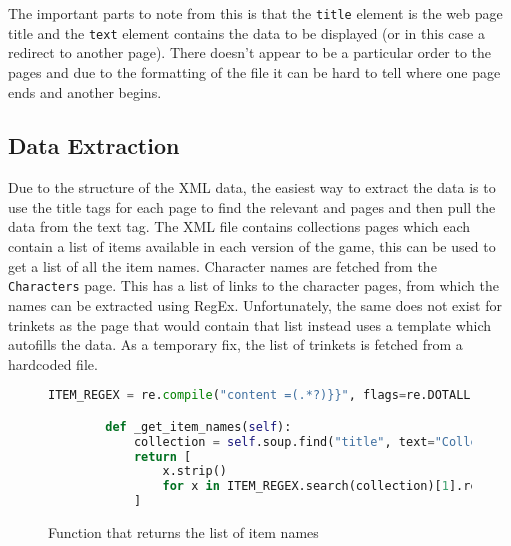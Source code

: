 The important parts to note from this is that the \verb|title| element is the web page title and the \verb|text| element contains the data to be displayed (or in this case a redirect to another page).
There doesn't appear to be a particular order to the pages and due to the formatting of the file it can be hard to tell where one page ends and another begins.
\subsection{Data Extraction}
Due to the structure of the XML data, the easiest way to extract the data is to use the title tags for each page to find the relevant and pages 
and then pull the data from the text tag. The XML file contains collections pages which each contain a list of items available in each version of the game, this can be 
used to get a list of all the item names. Character names are fetched from the \verb|Characters| page. This has a list of links to the character pages, from which the names can be extracted using RegEx. 
Unfortunately, the same does not exist for trinkets as the page that would contain that list instead uses a template which autofills the data. 
As a temporary fix, the list of trinkets is fetched from a hardcoded file.
\begin{figure}[H]
    \begin{lstlisting}[language=Python]
        ITEM_REGEX = re.compile("content =(.*?)}}", flags=re.DOTALL)

        def _get_item_names(self):
            collection = self.soup.find("title", text="Collection Page (Repentance)").find_parent("page").find("text").text
            return [
                x.strip()
                for x in ITEM_REGEX.search(collection)[1].replace("\n", "").replace("Number Two", "No. 2").split(",")
            ]
    \end{lstlisting}
    \caption{Function that returns the list of item names}
\end{figure}

